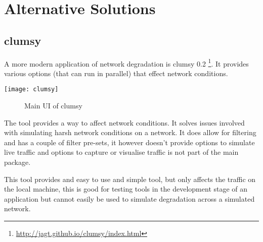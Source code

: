 \section{Alternative Solutions}


\subsection{clumsy}
A more modern application of network degradation is clumsy 0.2 \footnote{\url{http://jagt.github.io/clumsy/index.html}}. It provides various options (that can run in parallel) that effect network conditions. 

\begin{center}
	\texttt{[image: clumsy]}
	\begin{figure}[h]
		\caption{Main UI of clumsy}
	\end{figure}
\end{center}

The tool provides a way to affect network conditions. It solves issues involved with simulating harsh network conditions on a network. It does allow for filtering and has a couple of filter pre-sets, it however doesn't provide options to simulate live traffic and options to capture or visualise traffic is not part of the main package.

This tool provides and easy to use and simple tool, but only affects the traffic on the local machine, this is good for testing tools in the development stage of an application but cannot easily be used to simulate degradation across a simulated network.

